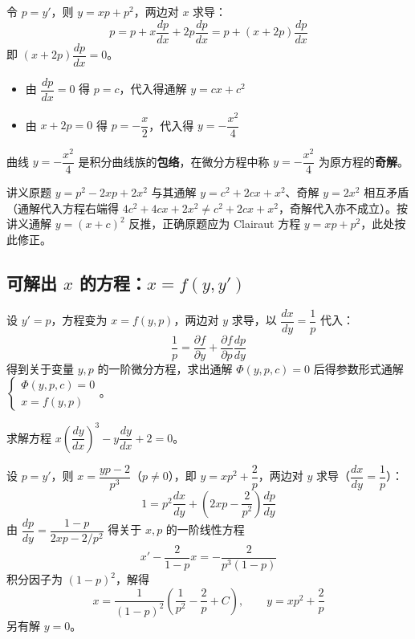 \begin{solution}
令 $p = y'$，则 $y = xp + p^2$，两边对 $x$ 求导：
$$p = p + x\frac{dp}{dx} + 2p\frac{dp}{dx} = p + (x + 2p)\frac{dp}{dx}$$
即 $(x + 2p)\dfrac{dp}{dx} = 0$。

\begin{itemize}
    \item 由 $\dfrac{dp}{dx} = 0$ 得 $p = c$，代入得通解 $y = cx + c^2$
    \item 由 $x + 2p = 0$ 得 $p = -\dfrac{x}{2}$，代入得 $y = -\dfrac{x^2}{4}$
\end{itemize}
曲线 $y = -\dfrac{x^2}{4}$ 是积分曲线族的\textbf{包络}，在微分方程中称 $y = -\dfrac{x^2}{4}$ 为原方程的\textbf{奇解}。

\begin{remark}
讲义原题 $y = p^2 - 2xp + 2x^2$ 与其通解 $y = c^2 + 2cx + x^2$、奇解 $y = 2x^2$ 相互矛盾（通解代入方程右端得 $4c^2+4cx+2x^2 \neq c^2+2cx+x^2$，奇解代入亦不成立）。按讲义通解 $y = (x+c)^2$ 反推，正确原题应为 Clairaut 方程 $y = xp + p^2$，此处按此修正。
\end{remark}
\end{solution}

\subsection{可解出 $x$ 的方程：$x = f(y, y')$}

设 $y' = p$，方程变为 $x = f(y, p)$，两边对 $y$ 求导，以 $\dfrac{dx}{dy} = \dfrac{1}{p}$ 代入：
$$\frac{1}{p} = \frac{\partial f}{\partial y} + \frac{\partial f}{\partial p}\frac{dp}{dy}$$
得到关于变量 $y, p$ 的一阶微分方程，求出通解 $\Phi(y, p, c) = 0$ 后得参数形式通解 $\begin{cases} \Phi(y,p,c) = 0 \\ x = f(y, p) \end{cases}$。

\begin{example}
求解方程 $x\left(\dfrac{dy}{dx}\right)^3 - y\dfrac{dy}{dx} + 2 = 0$。
\end{example}

\begin{solution}
设 $p = y'$，则 $x = \dfrac{yp - 2}{p^3}$（$p \neq 0$），即 $y = xp^2 + \dfrac{2}{p}$，两边对 $y$ 求导（$\dfrac{dx}{dy} = \dfrac{1}{p}$）：
$$1 = p^2\frac{dx}{dy} + \left(2xp - \frac{2}{p^2}\right)\frac{dp}{dy}$$
由 $\dfrac{dp}{dy} = \dfrac{1-p}{2xp - 2/p^2}$ 得关于 $x, p$ 的一阶线性方程
$$x' - \frac{2}{1-p}x = -\frac{2}{p^3(1-p)}$$
积分因子为 $(1-p)^2$，解得
$$x = \frac{1}{(1-p)^2}\left(\frac{1}{p^2} - \frac{2}{p} + C\right), \qquad y = xp^2 + \frac{2}{p}$$
另有解 $y = 0$。
\end{solution}

